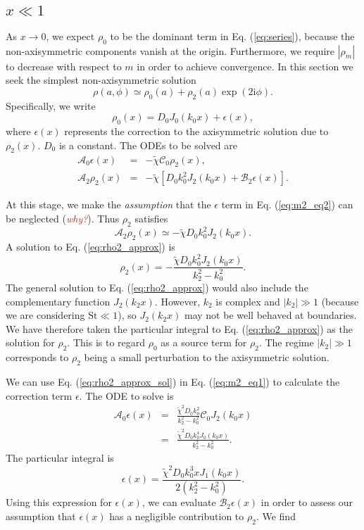 \documentclass[apj]{emulateapj}
\def\brown#1{\textcolor{brown}{#1}}
\newcommand{\comm}[1]{({\it \brown{#1}})}
\newcommand{\Eq}[1]{Eq. (\ref{#1})}
\newcommand{\eq}[1]{\Eq{#1}}
\newcommand{\beq}{\begin{equation}}
\newcommand{\eeq}{\end{equation}}
\newcommand{\beqn}{\begin{eqnarray}}
\newcommand{\eeqn}{\end{eqnarray}}
\begin{document}
\subsection{$x\ll 1$}
As $x\to0$, we expect $\rho_0$ to be the dominant term in
\eq{eq:series}, because the non-axisymmetric components vanish
at the origin. Furthermore, we require $|\rho_m|$ to decrease with
respect to $m$ in order to achieve convergence. In this section we
seek the simplest non-axisymmetric solution
\beq
\rho(a,\phi) \simeq \rho_0(a) + \rho_2(a)\exp{\left(2\mathrm{i}\phi\right)}. 
\eeq
Specifically, we write
\beq
\rho_0(x) = D_0J_0(k_0x) + \epsilon(x),  
\eeq
where $\epsilon(x)$ represents the correction to the axisymmetric
solution due to $\rho_2(x)$. $D_0$ is a constant. The ODEs to be
solved are 
\beqn
\mathcal{A}_0\epsilon(x) &=& -\tilde{\chi}\mathcal{C}_0\rho_2(x),\label{eq:m2_eq1}\\
\mathcal{A}_2\rho_2(x) &=& -\tilde{\chi}\left[D_0k_0^2J_2(k_0x) +
  \mathcal{B}_2\epsilon(x)\right].\label{eq:m2_eq2} 
\eeqn

At this stage, we make the \emph{assumption} that the $\epsilon$ term
in \eq{eq:m2_eq2} can be neglected \comm{why?}. Thus $\rho_2$ satisfies
\beq\label{eq:rho2_approx}
\mathcal{A}_2\rho_2(x) \simeq -\tilde{\chi}D_0k_0^2J_2(k_0x).
\eeq
A solution to \eq{eq:rho2_approx} is
\beq\label{eq:rho2_approx_sol}
\rho_2(x)  = -\frac{\tilde{\chi}D_0k_0^2J_2(k_0x)}{k_2^2 - k_0^2}. 
\eeq
The general solution to \eq{eq:rho2_approx} would also include the
complementary function $J_2(k_2x)$. However, $k_2$ is complex and $|k_2|\gg 1$ (because we are considering
$\mathrm{St}\ll1$), so $J_2(k_2x)$
may not be well behaved at boundaries. We have therefore taken the
particular integral to \eq{eq:rho2_approx} as the solution for
$\rho_2$. This is to regard $\rho_0$ as a source term for
$\rho_2$. The regime $|k_2|\gg1$ corresponds to  
$\rho_2$ being a small perturbation to the
axisymmetric solution. 

We can use \eq{eq:rho2_approx_sol} in \eq{eq:m2_eq1} to
calculate the correction term $\epsilon$. The ODE to solve is
\beqn
\mathcal{A}_0\epsilon(x)
&=&\frac{\tilde{\chi}^2D_0k_0^2}{k_2^2-k_0^2}\mathcal{C}_0J_2(k_0x) \nonumber \\ 
&=&\frac{\tilde{\chi}^2D_0k_0^4J_0(k_0x)}{k_2^2-k_0^2}.
\eeqn
The particular integral is 
\beq
\epsilon(x) = \frac{\tilde{\chi}^2D_0k_0^3xJ_1(k_0x)}{2\left(k_2^2 -
  k_0^2\right)}. 
\eeq
Using this expression for $\epsilon(x)$, we can evaluate
$\mathcal{B}_2\epsilon(x)$ in order to assess our assumption that
$\epsilon(x)$ has a negligible contribution to $\rho_2$. We find
\end{document}
